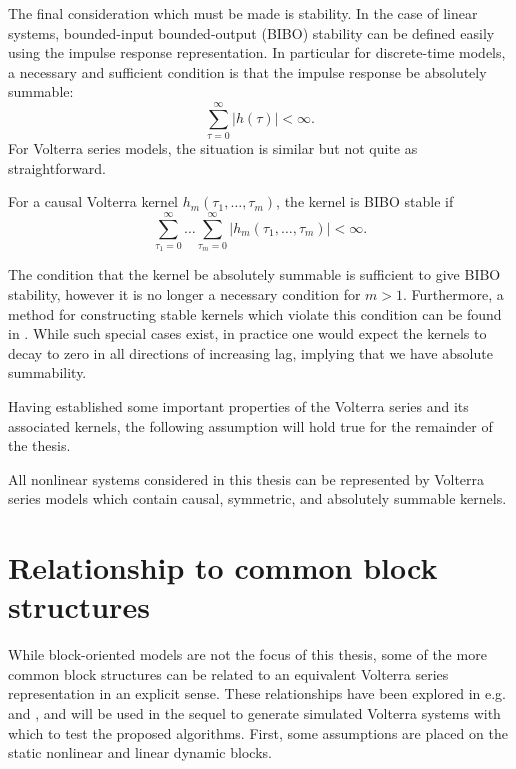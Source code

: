 The final consideration which must be made is stability. In the case of linear systems, bounded-input bounded-output (BIBO) stability can be defined easily using the impulse response representation. In particular for discrete-time models, a necessary and sufficient condition is that the impulse response be absolutely summable:
\begin{equation}
\sum_{\tau=0}^{\infty} |h(\tau)| < \infty.
\end{equation}
For Volterra series models, the situation is similar but not quite as straightforward. 
\begin{property}
For a causal Volterra kernel $h_m(\tau_1, \hdots, \tau_m)$, the kernel is BIBO stable if
\begin{equation}
\sum_{\tau_1=0}^{\infty} \hdots \sum_{\tau_m=0}^{\infty}|h_m(\tau_1, \hdots, \tau_m)| < \infty.
\end{equation}
\end{property}
The condition that the kernel be absolutely summable is sufficient to give BIBO stability, however it is no longer a necessary condition for $m>1$. Furthermore, a method for constructing stable kernels which violate this condition can be found in \cite{Schetzen1980}. While such special cases exist, in practice one would expect the kernels to decay to zero in all directions of increasing lag, implying that we have absolute summability.

Having established some important properties of the Volterra series and its associated kernels, the following assumption will hold true for the remainder of the thesis.
\begin{assum}
All nonlinear systems considered in this thesis can be represented by Volterra series models which contain causal, symmetric, and absolutely summable kernels.
\end{assum}

\section{Relationship to common block structures}
\label{sec:BlockStructureRelationship}

While block-oriented models are not the focus of this thesis, some of the more common block structures can be related to an equivalent Volterra series representation in an explicit sense. These relationships have been explored in e.g. \cite{Westwick2003} and \cite{Kibangou2010}, and will be used in the sequel to generate simulated Volterra systems with which to test the proposed algorithms. First, some assumptions are placed on the static nonlinear and linear dynamic blocks.

